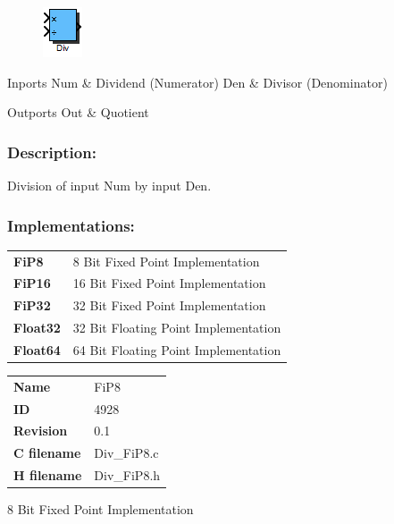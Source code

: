\label{block:Div}
\begin{figure}[H]\includegraphics{Div}\end{figure} 

\begin{XtoCtabular}{Inports}
Num & Dividend (Numerator)\tabularnewline
\hline
Den & Divisor (Denominator)\tabularnewline
\hline
\end{XtoCtabular}


\begin{XtoCtabular}{Outports}
Out & Quotient\tabularnewline
\hline
\end{XtoCtabular}

\subsubsection*{Description:}
Division of input Num by input Den.


\subsubsection*{Implementations:}
\begin{tabular}{l l}
\textbf{FiP8} & 8 Bit Fixed Point Implementation\tabularnewline
\textbf{FiP16} & 16 Bit Fixed Point Implementation\tabularnewline
\textbf{FiP32} & 32 Bit Fixed Point Implementation\tabularnewline
\textbf{Float32} & 32 Bit Floating Point Implementation\tabularnewline
\textbf{Float64} & 64 Bit Floating Point Implementation\tabularnewline
\end{tabular}

\nopagebreak[0]
\begin{tabular}{l l}
\textbf{Name} & FiP8 \tabularnewline
\textbf{ID} & 4928 \tabularnewline
\textbf{Revision} & 0.1 \tabularnewline
\textbf{C filename} & Div\_FiP8.c \tabularnewline
\textbf{H filename} & Div\_FiP8.h \tabularnewline
\end{tabular}
\vspace{1ex}

8 Bit Fixed Point Implementation


